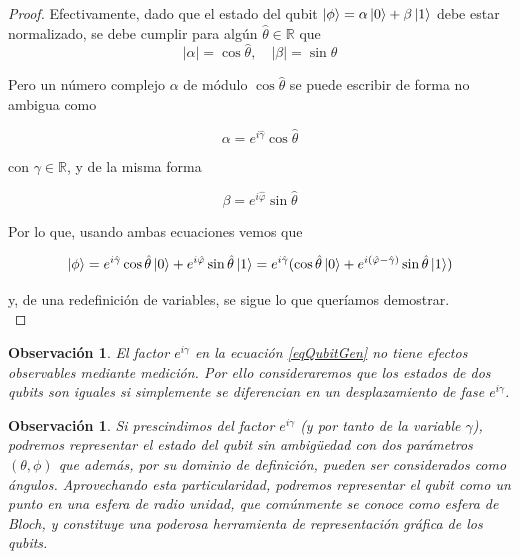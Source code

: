 \documentclass[11pt, spanish]{report}
\numberwithin{equation}{section}
\newtheorem{obs}[defin]{Observación}
\numberwithin{defin}{section}
\begin{document}
\begin{proof}
Efectivamente, dado que el estado del qubit $\ket{\phi}=\alpha\ket{0}+\beta\ket{1}$ debe estar normalizado, se debe cumplir para algún $\hat{\theta}\in\mathbb{R}$ que
\begin{equation}
|\alpha|=\cos\hat{\theta},\quad |\beta|=\sin\hat{\theta}
\end{equation}

Pero un número complejo $\alpha$ de módulo $\cos\hat{\theta}$ se puede escribir de forma no ambigua como 

\begin{equation}
\alpha=e^{i\hat{\gamma}}\cos\hat{\theta}
\end{equation}

con $\gamma\in\mathbb{R}$, y de la misma forma 

\begin{equation}
\beta=e^{i\hat{\varphi}}\sin\hat{\theta}
\end{equation}

Por lo que, usando ambas ecuaciones vemos que

\begin{equation}
\ket{\phi}=e^{i\hat{\gamma}}\cos\hat{\theta}\ket{0}+e^{i\hat{\varphi}}\sin\hat{\theta}\ket{1}=e^{i\hat{\gamma}}(\cos\hat{\theta}\ket{0}+e^{i(\hat{\varphi}-\hat{\gamma})}\sin\hat{\theta}\ket{1})
\end{equation}

y, de una redefinición de variables, se sigue lo que queríamos demostrar.\\
\end{proof}

\begin{obs}\label{ObservacionEfectosObservables} El factor $e^{i\gamma}$ en la ecuación \ref{eqQubitGen} no tiene efectos observables mediante medición. Por ello consideraremos que los estados de dos qubits son iguales si simplemente se diferencian en un desplazamiento de fase $e^{i\gamma}$.
\end{obs}

\begin{obs} Si prescindimos del factor $e^{i\gamma}$ (y por tanto de la variable $\gamma$), podremos representar el estado del qubit sin ambigüedad con dos parámetros $(\theta,\phi)$	que además, por su dominio de definición, pueden ser considerados como ángulos. Aprovechando esta particularidad, podremos representar el qubit como un punto en una esfera de radio unidad, que comúnmente se conoce como \textit{esfera de Bloch}, y constituye una poderosa herramienta de representación gráfica de los qubits.
\end{obs}
\end{document}
